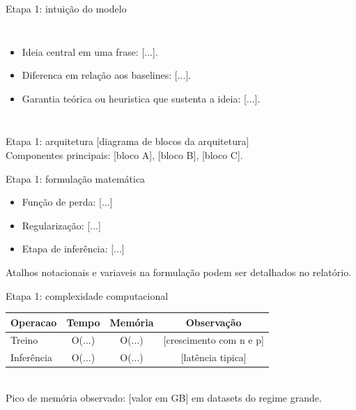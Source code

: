 \documentclass[aspectratio=169,11pt]{beamer}
\begin{document}
\begin{frame}{Etapa 1: intuição do modelo}
    \begin{columns}[T,onlytextwidth]
        \begin{itemize}
            \item Ideia central em uma frase: [...].
            \item Diferenca em relação aos baselines: [...].
            \item Garantia teórica ou heuristica que sustenta a ideia: [...].
        \end{itemize}
    \end{columns}
\end{frame}

\begin{frame}{Etapa 1: arquitetura}
    \centering
    [diagrama de blocos da arquitetura]
    \\[0.4em]
    \footnotesize Componentes principais: [bloco A], [bloco B], [bloco C].
\end{frame}

\begin{frame}{Etapa 1: formulação matemática}
    \begin{itemize}
        \item Função de perda: [...]
        \item Regularização: [...]
        \item Etapa de inferência: [...]
    \end{itemize}
    \vspace{0.3em}
    \footnotesize Atalhos notacionais e variaveis na formulação podem ser detalhados no relatório.
\end{frame}

\begin{frame}{Etapa 1: complexidade computacional}
    \footnotesize
    \begin{tabular}{l c c c}
        \toprule
        \textbf{Operacao} & \textbf{Tempo} & \textbf{Memória} & \textbf{Observação} \\
        \midrule
        Treino   & O(...) & O(...) & [crescimento com n e p] \\
        Inferência & O(...) & O(...) & [latência tipica] \\
        \bottomrule
    \end{tabular}
    \vspace{0.5em}
    \\
    Pico de memória observado: [valor em GB] em datasets do regime grande.
\end{frame}
\end{document}
